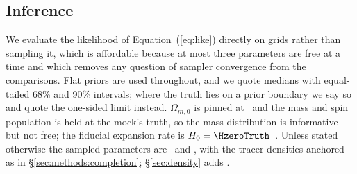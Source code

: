 \subsection{Inference}
\label{sec:methods:inference}

We evaluate the likelihood of Equation~(\ref{eq:like}) directly on grids rather
than sampling it, which is affordable because at most three parameters are free
at a time and which removes any question of sampler convergence from the
comparisons. Flat priors are used throughout, and we quote medians with
equal-tailed 68\% and 90\% intervals; where the truth lies on a prior boundary
we say so and quote the one-sided limit instead. $\Omega_{m,0}$ is pinned at
\OmZeroTruth\ and the mass and spin population is held at the mock's truth, so
the mass distribution is informative but not free; the fiducial expansion rate
is $\Hz = \HzeroTruth$~\kmsmpc. Unless stated otherwise the sampled parameters
are \Hz\ and \fagn, with the tracer densities anchored as in
\S\ref{sec:methods:completion}; \S\ref{sec:density} adds \lognzagn.
